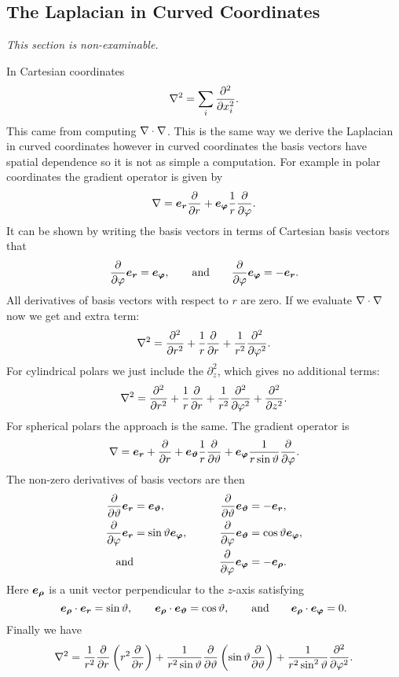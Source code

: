 \documentclass[a4paper]{article}
\begin{document}
    \subsection{The Laplacian in Curved Coordinates}
    \textit{This section is non-examinable.}
    
    In Cartesian coordinates
    \[\nabla^2 = \sum_i \pdv[2]{x_i}.\]
    This came from computing \(\nabla\cdot\nabla\).
    This is the same way we derive the Laplacian in curved coordinates however in curved coordinates the basis vectors have spatial dependence so it is not as simple a computation.
    For example in polar coordinates the gradient operator is given by
    \[\nabla = \bm{e_{r}}\pdv{r} + \bm{e_{\varphi}}\frac{1}{r}\pdv{\varphi}.\]
    It can be shown by writing the basis vectors in terms of Cartesian basis vectors that
    \[\pdv{\varphi}\bm{e_{r}} = \bm{e_{\varphi}}, \qquad\text{and}\qquad \pdv{\varphi}\bm{e_{\varphi}} = - \bm{e_{r}}.\]
    All derivatives of basis vectors with respect to \(r\) are zero.
    If we evaluate \(\nabla\cdot\nabla\) now we get and extra term:
    \[\nabla^2 = \pdv[2]{r} + \frac{1}{r}\pdv{r} + \frac{1}{r^2}\pdv[2]{\varphi}.\]
    For cylindrical polars we just include the \(\partial_z^2\), which gives no additional terms:
    \[\nabla^2 = \pdv[2]{r} + \frac{1}{r}\pdv{r} + \frac{1}{r^2}\pdv[2]{\varphi} + \pdv[2]{z}.\]
    For spherical polars the approach is the same.
    The gradient operator is
    \[\nabla = \bm{e_{r}} + \pdv{r} + \bm{e_{\vartheta}} \frac{1}{r}\pdv{\vartheta} + \bm{e_{\varphi}} \frac{1}{r\sin\vartheta}\pdv{\varphi}.\]
    The non-zero derivatives of basis vectors are then
    \begin{align*}
        \pdv{\vartheta}\bm{e_{r}} &= \bm{e_{\vartheta}}, \qquad & \pdv{\vartheta}\bm{e_{\vartheta}} &= -\bm{e_{r}},\\
        \pdv{\varphi}\bm{e_{r}} &= \sin\vartheta \bm{e_{\varphi}}, \qquad & \pdv{\varphi}\bm{e_{\vartheta}} &= \cos\vartheta\bm{e_{\varphi}},\\
        \text{and} && \pdv{\varphi}\bm{e_{\varphi}} &= -\bm{e_{\rho}}.
    \end{align*}
    Here \(\bm{e_{\rho}}\) is a unit vector perpendicular to the \(z\)-axis satisfying
    \[\bm{e_{\rho}}\cdot\bm{e_{r}} = \sin\vartheta, \qquad \bm{e_{\rho}}\cdot\bm{e_{\vartheta}} = \cos\vartheta, \qquad \text{and}\qquad \bm{e_{\rho}}\cdot\bm{e_{\varphi}} = 0.\]
    Finally we have
    \[\nabla^2 = \frac{1}{r^2}\pdv{r}\left(r^2\pdv{r}\right) + \frac{1}{r^2\sin\vartheta}\pdv{\vartheta}\left(\sin\vartheta\pdv{\vartheta}\right) + \frac{1}{r^2\sin^2\vartheta}\pdv[2]{\varphi}.\]
    
\end{document}
